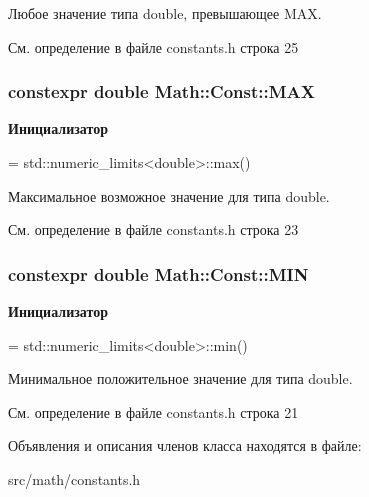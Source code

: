 Любое значение типа double, превышающее M\+AX. 



См. определение в файле constants.\+h строка 25

\subsubsection[{\texorpdfstring{M\+AX}{MAX}}]{\setlength{\rightskip}{0pt plus 5cm}constexpr double Math\+::\+Const\+::\+M\+AX\hspace{0.3cm}{\ttfamily [static]}}\hypertarget{class_math_1_1_const_aa6f0fbdf83bf388173d9712c2a9d2046}{}\label{class_math_1_1_const_aa6f0fbdf83bf388173d9712c2a9d2046}
{\bfseries Инициализатор}
\begin{DoxyCode}
=
        std::numeric\_limits<double>::max()
\end{DoxyCode}


Максимальное возможное значение для типа double. 



См. определение в файле constants.\+h строка 23

\subsubsection[{\texorpdfstring{M\+IN}{MIN}}]{\setlength{\rightskip}{0pt plus 5cm}constexpr double Math\+::\+Const\+::\+M\+IN\hspace{0.3cm}{\ttfamily [static]}}\hypertarget{class_math_1_1_const_a787c7176528a33522741da6b45761378}{}\label{class_math_1_1_const_a787c7176528a33522741da6b45761378}
{\bfseries Инициализатор}
\begin{DoxyCode}
=
        std::numeric\_limits<double>::min()
\end{DoxyCode}


Минимальное положительное значение для типа double. 



См. определение в файле constants.\+h строка 21



Объявления и описания членов класса находятся в файле\+:\begin{DoxyCompactItemize}
\item 
src/math/constants.\+h\end{DoxyCompactItemize}
